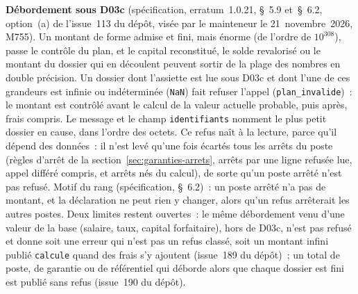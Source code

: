 \documentclass[a4paper,11pt]{article}
\newcommand{\code}[1]{\texttt{\small #1}}
\begin{document}
\textbf{Débordement sous D03c} (spécification, erratum~1.0.21, §~5.9
et~§~6.2, option~(a) de l'issue~113 du dépôt, visée par le mainteneur le
21~novembre~2026, M755). Un montant de forme admise et fini, mais énorme
(de l'ordre de $10^{308}$), passe le contrôle du plan, et le capital
reconstitué, le solde revalorisé ou le montant du dossier qui en découlent
peuvent sortir de la plage des nombres en double précision. Un dossier dont
l'assiette est lue sous D03c et dont l'une de ces grandeurs est infinie ou
indéterminée (\code{NaN}) fait refuser l'appel (\code{plan\_invalide})~: le
montant est contrôlé avant le calcul de la valeur actuelle probable, puis
après, frais compris. Le message et le champ \code{identifiants} nomment le
plus petit dossier en cause, dans l'ordre des octets. Ce refus naît à la
lecture, parce qu'il dépend des données~: il n'est levé qu'une fois écartés
tous les arrêts du poste (règles d'arrêt de la
section~\ref{sec:garanties-arrets}, arrêts par une ligne refusée lue,
appel différé compris, et arrêts nés du calcul), de sorte qu'un poste
arrêté n'est pas refusé. Motif du rang (spécification, §~6.2)~: un poste
arrêté n'a pas de montant, et la déclaration ne peut rien y changer, alors
qu'un refus arrêterait les autres postes.
Deux limites restent ouvertes~: le même débordement venu d'une valeur de la
base (salaire, taux, capital forfaitaire), hors de D03c, n'est pas refusé
et donne soit une erreur qui n'est pas un refus classé, soit un montant
infini publié \code{calcule} quand des frais s'y ajoutent (issue~189 du
dépôt)~; un total de poste, de garantie ou de référentiel qui déborde
alors que chaque dossier est fini est publié sans refus (issue~190 du
dépôt).
\end{document}

